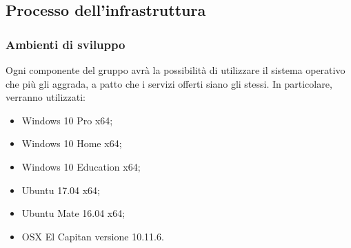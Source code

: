


\subsection{Processo dell'infrastruttura}

\subsubsection{Ambienti di sviluppo}
	Ogni componente del gruppo avrà la possibilità di utilizzare il sistema operativo che più gli aggrada, a patto che i servizi offerti siano gli stessi. In particolare, verranno utilizzati:
	\begin{itemize}
		\item Windows 10 Pro x64;
		\item Windows 10 Home x64;
		\item Windows 10 Education x64;
		\item Ubuntu 17.04 x64;
		\item Ubuntu Mate 16.04 x64;
		\item OSX El Capitan versione 10.11.6.
	\end{itemize}
	
